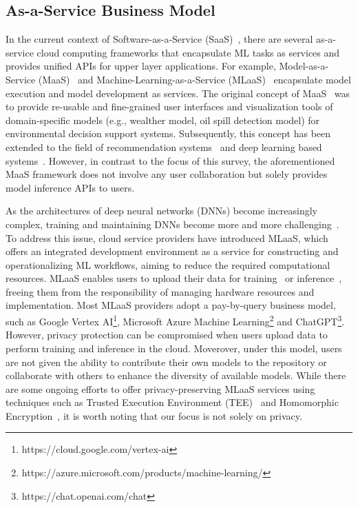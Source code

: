 \subsection{As-a-Service Business Model}
\label{sec:aas}
In the current context of Software-as-a-Service (SaaS)~\cite{brereton1999future}, there are several as-a-service cloud computing frameworks that encapsulate ML tasks as services and provides unified APIs for upper layer applications. 
For example, Model-as-a-Service (MaaS)~\cite{geller2007model, roman2009model, zou2012maas, liu2021jizhi, sun2022black} and Machine-Learning-as-a-Service (MLaaS)~\cite{ribeiro2015mlaas, hanzlik2021mlcapsule, hesamifard2018privacy,li2017scaling, kourtellis2020flaas} encapsulate model execution and model development as services.
The original concept of MaaS~\cite{geller2007model, roman2009model} was to provide re-usable and fine-grained user interfaces and visualization tools of domain-specific models (e.g., wealther model, oil spill detection model) for environmental decision support systems.
Subsequently, this concept has been extended to the field of recommendation systems~\cite{zou2012maas} and deep learning based systems~\cite{liu2021jizhi, sun2022black}.
However, in contrast to the focus of this survey, the aforementioned MaaS framework does not involve any user collaboration but solely provides model inference APIs to users.

As the architectures of deep neural networks (DNNs) become increasingly complex, training and maintaining DNNs become more and more challenging~\cite{han2021pre}. 
To address this issue, cloud service providers have introduced MLaaS, which offers an integrated development environment as a service for constructing and operationalizing ML workflows, aiming to reduce the required computational resources.
MLaaS enables users to upload their data for training~\cite{ribeiro2015mlaas, zhao2021veriml, hesamifard2018privacy} or inference~\cite{hanzlik2021mlcapsule}, freeing them from the responsibility of managing hardware resources and implementation.
Most MLaaS providers adopt a pay-by-query business model, such as Google Vertex AI\footnote{https://cloud.google.com/vertex-ai}, Microsoft Azure Machine Learning\footnote{https://azure.microsoft.com/products/machine-learning/} and ChatGPT\footnote{https://chat.openai.com/chat}.
However, privacy protection can be compromised when users upload data to perform training and inference in the cloud.
Moverover, under this model, users are not given the ability to contribute their own models to the repository or collaborate with others to enhance the diversity of available models. 
While there are some ongoing efforts to offer privacy-preserving MLaaS services using techniques such as Trusted Execution Environment (TEE)~\cite{hanzlik2021mlcapsule, mckeen2016intel} and Homomorphic Encryption~\cite{hesamifard2018privacy,gentry2009fully}, it is worth noting that our focus is not solely on privacy.

